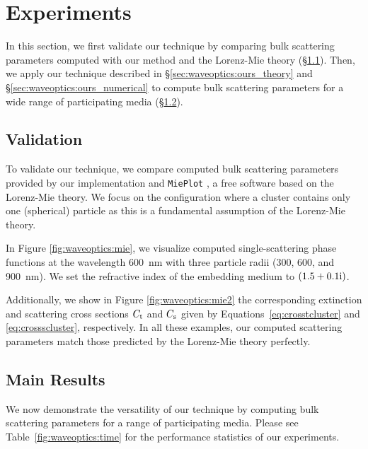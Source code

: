 \section{Experiments}
\label{sec:waveoptics:results}

In this section, we first validate our technique by comparing bulk scattering parameters computed with our method and the Lorenz-Mie theory (\S\ref{ssec:result_validation}).
Then, we apply our technique described in \S\ref{sec:waveoptics:ours_theory} and \S\ref{sec:waveoptics:ours_numerical} to compute bulk scattering parameters for a wide range of participating media (\S\ref{ssec:result_main}).


\subsection{Validation}
\label{ssec:result_validation}

To validate our technique, we compare computed bulk scattering parameters provided by our implementation and \texttt{MiePlot} \cite{laven2011mieplot}, a free software based on the Lorenz-Mie theory.
We focus on the configuration where a cluster contains only one (spherical) particle as this is a fundamental assumption of the Lorenz-Mie theory.



In Figure \ref{fig:waveoptics:mie}, we visualize computed single-scattering phase functions at the wavelength 600~nm with three particle radii (300, 600, and 900~nm).
We set the refractive index of the embedding medium to $(1.5 + 0.1\mathrm{i})$.

Additionally, we show in Figure \ref{fig:waveoptics:mie2} the corresponding extinction and scattering cross sections $C_\mathrm{t}$ and $C_\mathrm{s}$ given by Equations~\eqref{eq:crosstcluster} and \eqref{eq:crossscluster}, respectively.
In all these examples, our computed scattering parameters match those predicted by the Lorenz-Mie theory perfectly.




\subsection{Main Results}
\label{ssec:result_main}
%
We now demonstrate the versatility of our technique by computing bulk scattering parameters for a range of participating media.
Please see Table~\ref{fig:waveoptics:time} for the performance statistics of our experiments.

